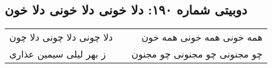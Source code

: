 \begin{center}
\section*{دوبیتی شماره ۱۹۰: دلا خونی دلا خونی دلا خون}
\label{sec:190}
\begin{longtable}{l p{0.5cm} r}
دلا چونی دلا چونی دلا چون
&&
همه خونی همه خونی همه خون
\\
ز بهر لیلی سیمین عذاری
&&
چو مجنونی چو مجنونی چو مجنون
\\
\end{longtable}
\end{center}
